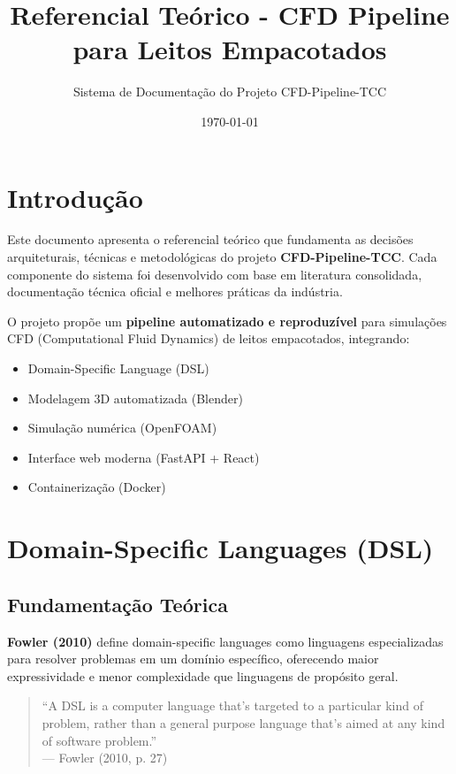 \documentclass[12pt,a4paper]{article}
\title{\textbf{Referencial Teórico - CFD Pipeline para Leitos Empacotados}}
\author{Sistema de Documentação do Projeto CFD-Pipeline-TCC}
\date{\today}
\begin{document}
\maketitle

\section{Introdução}

Este documento apresenta o referencial teórico que fundamenta as decisões arquiteturais, técnicas e metodológicas do projeto \textbf{CFD-Pipeline-TCC}. Cada componente do sistema foi desenvolvido com base em literatura consolidada, documentação técnica oficial e melhores práticas da indústria.

O projeto propõe um \textbf{pipeline automatizado e reproduzível} para simulações CFD (Computational Fluid Dynamics) de leitos empacotados, integrando:
\begin{itemize}
    \item Domain-Specific Language (DSL)
    \item Modelagem 3D automatizada (Blender)
    \item Simulação numérica (OpenFOAM)
    \item Interface web moderna (FastAPI + React)
    \item Containerização (Docker)
\end{itemize}

\section{Domain-Specific Languages (DSL)}

\subsection{Fundamentação Teórica}

\textbf{Fowler (2010)} define domain-specific languages como linguagens especializadas para resolver problemas em um domínio específico, oferecendo maior expressividade e menor complexidade que linguagens de propósito geral.

\begin{quote}
``A DSL is a computer language that's targeted to a particular kind of problem, rather than a general purpose language that's aimed at any kind of software problem.''\\
— Fowler (2010, p. 27)
\end{quote}
\end{document}

